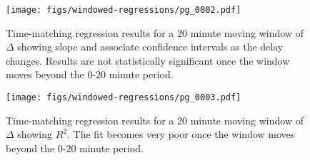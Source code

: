 \documentclass[12pt]{article}
\begin{document}
\begin{figure}[h]
 \texttt{[image: figs/windowed-regressions/pg\_0002.pdf]}
 \caption{Time-matching regression results for a 20 minute moving window of
 $\Delta$ showing slope and associate confidence intervals as the delay
 changes.  Results are not statistically significant once the window
 moves beyond the 0-20 minute period. \label{fig:windowed-regression-slope}}
\end{figure}

\begin{figure}[h]
 \texttt{[image: figs/windowed-regressions/pg\_0003.pdf]}
 \caption{Time-matching regression results for a 20 minute moving window of
 $\Delta$ showing $R^2$.  The fit becomes very poor once
 the window moves beyond the 0-20 minute period. \label{fig:windowed-regression-r-squared}}
\end{figure}
\end{document}
